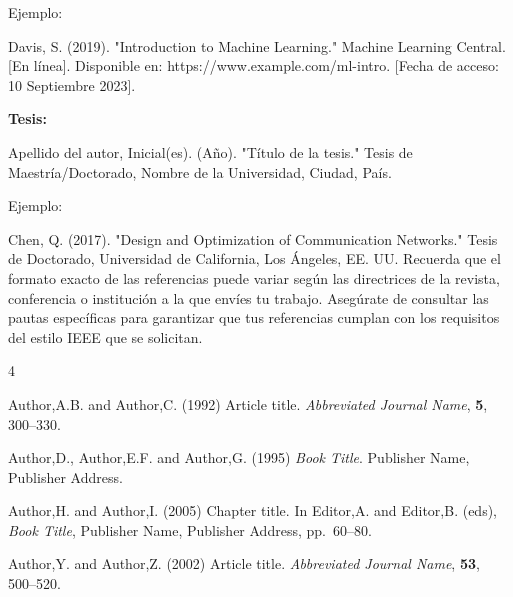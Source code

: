 \documentclass[a4paper,twocolumn,10.5pt]{article}
\begin{document}
Ejemplo:

Davis, S. (2019). "Introduction to Machine Learning." Machine Learning Central. [En línea]. Disponible en: https://www.example.com/ml-intro. [Fecha de acceso: 10 Septiembre 2023].

\textbf{Tesis:}

Apellido del autor, Inicial(es). (Año). "Título de la tesis." Tesis de Maestría/Doctorado, Nombre de la Universidad, Ciudad, País.

Ejemplo:

Chen, Q. (2017). "Design and Optimization of Communication Networks." Tesis de Doctorado, Universidad de California, Los Ángeles, EE. UU.
Recuerda que el formato exacto de las referencias puede variar según las directrices de la revista, conferencia o institución a la que envíes tu trabajo. Asegúrate de consultar las pautas específicas para garantizar que tus referencias cumplan con los requisitos del estilo IEEE que se solicitan.








\begin{thebibliography}{4}



Author,A.B. and Author,C. (1992)
Article title.
\textit{Abbreviated Journal Name}, \textbf{5}, 300--330.

Author,D., Author,E.F. and Author,G. (1995)
\textit{Book Title}.
Publisher Name, Publisher Address.

Author,H. and Author,I. (2005)
Chapter title.
In
Editor,A. and Editor,B. (eds),
\textit{Book Title},
Publisher Name, Publisher Address,
pp.\ 60--80.

Author,Y. and Author,Z. (2002)
Article title.
\textit{Abbreviated Journal Name}, \textbf{53}, 500--520.

\end{thebibliography}
\end{document}
